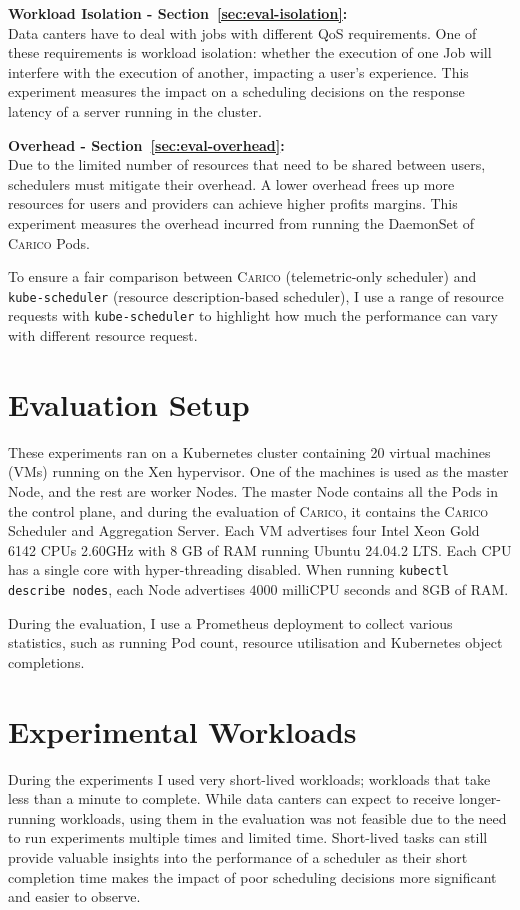 \textbf{Workload Isolation - Section~\ref{sec:eval-isolation}:}\\
Data canters have to deal with jobs with different QoS requirements. One of
these requirements is workload isolation: whether the execution of one Job will
interfere with the execution of another, impacting a user's experience. This
experiment measures the impact on a scheduling decisions on the response latency
of a server running in the cluster.

\textbf{Overhead - Section~\ref{sec:eval-overhead}:}\\
Due to the limited number of resources that need to be shared between users,
schedulers must mitigate their overhead. A lower overhead frees up more
resources for users and providers can achieve higher profits margins. This
experiment measures the overhead incurred from running the DaemonSet of
\textsc{Carico} Pods.

To ensure a fair comparison between \textsc{Carico} (telemetric-only scheduler)
and \texttt{kube-scheduler} (resource description-based scheduler), I use a
range of resource requests with \texttt{kube-scheduler} to highlight how much
the performance can vary with different resource request.

\section{Evaluation Setup}
These experiments ran on a Kubernetes cluster containing 20 virtual machines
(VMs) running on the Xen hypervisor. One of the machines is used as the master
Node, and the rest are worker Nodes. The master Node contains all the Pods in
the control plane, and during the evaluation of \textsc{Carico}, it contains the \textsc{Carico}
Scheduler and Aggregation Server. Each VM advertises four Intel Xeon Gold 6142
CPUs \@ 2.60GHz with 8 GB of RAM running Ubuntu 24.04.2 LTS. Each CPU has a
single core with hyper-threading disabled. When running \texttt{kubectl describe
nodes}, each Node advertises $4000$ milliCPU seconds and 8GB of RAM.

During the evaluation, I use a Prometheus deployment \cite{} to collect various
statistics, such as running Pod count, resource utilisation and Kubernetes
object completions.

%

\section{Experimental Workloads}
During the experiments I used very short-lived workloads; workloads that take
less than a minute to complete. While data canters can expect to receive
longer-running workloads, using them in the evaluation was not feasible due to
the need to run experiments multiple times and limited time. Short-lived tasks
can still provide valuable insights into the performance of a scheduler as their
short completion time makes the impact of poor scheduling decisions more
significant and easier to observe.


